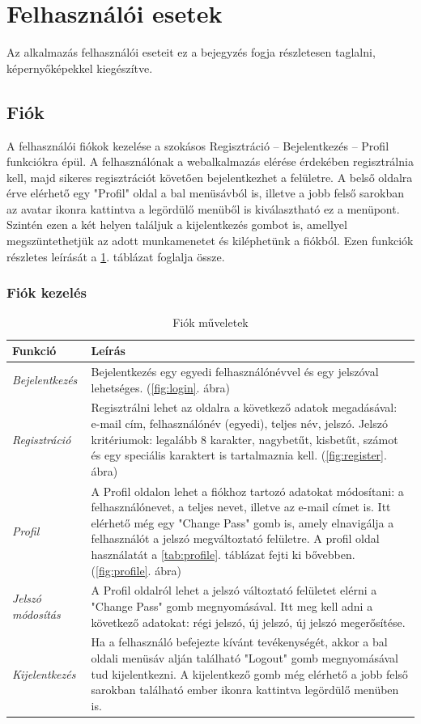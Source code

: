 \section{Felhasználói esetek}
Az alkalmazás felhasználói eseteit ez a bejegyzés fogja részletesen taglalni, képernyőképekkel kiegészítve.

\subsection{Fiók}
A felhasználói fiókok kezelése a szokásos Regisztráció – Bejelentkezés – Profil funkciókra épül. A felhasználónak a webalkalmazás elérése érdekében regisztrálnia kell, majd sikeres regisztrációt követően bejelentkezhet a felületre. A belső oldalra érve elérhető egy "Profil" oldal a bal menüsávból is, illetve a jobb felső sarokban az avatar ikonra kattintva a legördülő menüből is kiválasztható ez a menüpont. Szintén ezen a két helyen találjuk a kijelentkezés gombot is, amellyel megszüntethetjük az adott munkamenetet és kiléphetünk a fiókból. Ezen funkciók részletes leírását a \ref{tab:account}. táblázat foglalja össze.
\subsubsection{Fiók kezelés}

\begin{table}[H]
	\centering
	\begin{tabular}{ | m{} | m{} | }
		\hline
		\textbf{Funkció} & \textbf{Leírás} \\
		\hline \hline
		\emph{Bejelentkezés} & Bejelentkezés egy egyedi felhasználónévvel és egy jelszóval lehetséges. (\ref{fig:login}. ábra) \\
		\hline
		\emph{Regisztráció} &  Regisztrálni lehet az oldalra a következő adatok megadásával: e-mail cím, felhasználónév (egyedi), teljes név, jelszó. Jelszó kritériumok: legalább 8 karakter, nagybetűt, kisbetűt, számot és egy speciális karaktert is tartalmaznia kell. (\ref{fig:register}. ábra)  \\
		\hline
		\emph{Profil} & A Profil oldalon lehet a fiókhoz tartozó adatokat módosítani: a felhasználónevet, a teljes nevet, illetve az e-mail címet is. Itt elérhető még egy "Change Pass" gomb is, amely elnavigálja a felhasználót a jelszó megváltoztató felületre. A profil oldal használatát a \ref{tab:profile}. táblázat fejti ki bővebben. (\ref{fig:profile}. ábra) \\
		\hline
		\emph{Jelszó módosítás} & A Profil oldalról lehet a jelszó változtató felületet elérni a "Change Pass" gomb megnyomásával. Itt meg kell adni a következő adatokat: régi jelszó, új jelszó, új jelszó megerősítése. \\
		\hline
		\emph{Kijelentkezés} & Ha a felhasználó befejezte kívánt tevékenységét, akkor a bal oldali menüsáv alján található "Logout" gomb megnyomásával tud kijelentkezni. A kijelentkező gomb még elérhető a jobb felső sarokban található ember ikonra kattintva legördülő menüben is. \\
		\hline
	\end{tabular}
	\caption{Fiók műveletek}
	\label{tab:account}
\end{table}

